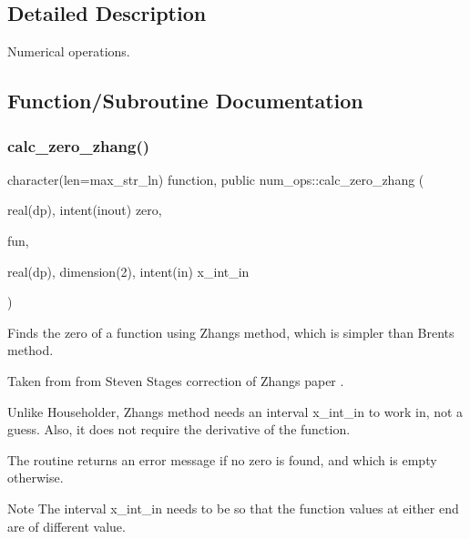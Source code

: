\subsection{Detailed Description}
Numerical operations. 

\subsection{Function/\+Subroutine Documentation}
\mbox{\label{namespacenum__ops_adcc4eacf15c931744316a004f4448b90}} 
\subsubsection{\texorpdfstring{calc\+\_\+zero\+\_\+zhang()}{calc\_zero\_zhang()}}
{\footnotesize\ttfamily character(len=max\+\_\+str\+\_\+ln) function, public num\+\_\+ops\+::calc\+\_\+zero\+\_\+zhang (\begin{DoxyParamCaption}\item[{real(dp), intent(inout)}]{zero,  }\item[{}]{fun,  }\item[{real(dp), dimension(2), intent(in)}]{x\+\_\+int\+\_\+in }\end{DoxyParamCaption})}



Finds the zero of a function using Zhang\textquotesingle{}s method, which is simpler than Brent\textquotesingle{}s method. 

Taken from from Steven Stage\textquotesingle{}s correction of Zhang\textquotesingle{}s paper \cite{zhang2011improvement}.

Unlike Householder, Zhang\textquotesingle{}s method needs an interval {\ttfamily x\+\_\+int\+\_\+in} to work in, not a guess. Also, it does not require the derivative of the function.

The routine returns an error message if no zero is found, and which is empty otherwise.

\begin{DoxyNote}{Note}
The interval {\ttfamily x\+\_\+int\+\_\+in} needs to be so that the function values at either end are of different value. 
\end{DoxyNote}

